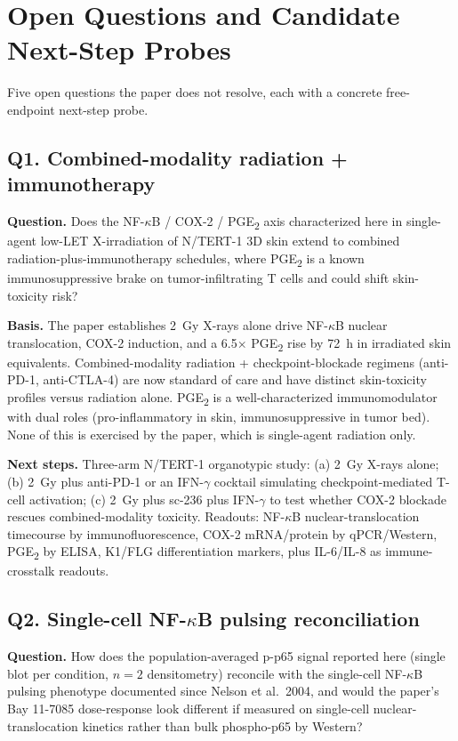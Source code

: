 \section{Open Questions and Candidate Next-Step Probes}

Five open questions the paper does not resolve, each with a concrete free-endpoint next-step probe.

\subsection*{Q1. Combined-modality radiation + immunotherapy}
\textbf{Question.} Does the NF-$\kappa$B / COX-2 / PGE\textsubscript{2} axis characterized here in single-agent low-LET X-irradiation of N/TERT-1 3D skin extend to combined radiation-plus-immunotherapy schedules, where PGE\textsubscript{2} is a known immunosuppressive brake on tumor-infiltrating T cells and could shift skin-toxicity risk?

\textbf{Basis.} The paper establishes 2~Gy X-rays alone drive NF-$\kappa$B nuclear translocation, COX-2 induction, and a 6.5$\times$ PGE\textsubscript{2} rise by 72~h in irradiated skin equivalents. Combined-modality radiation + checkpoint-blockade regimens (anti-PD-1, anti-CTLA-4) are now standard of care and have distinct skin-toxicity profiles versus radiation alone. PGE\textsubscript{2} is a well-characterized immunomodulator with dual roles (pro-inflammatory in skin, immunosuppressive in tumor bed). None of this is exercised by the paper, which is single-agent radiation only.

\textbf{Next steps.} Three-arm N/TERT-1 organotypic study: (a) 2~Gy X-rays alone; (b) 2~Gy plus anti-PD-1 or an IFN-$\gamma$ cocktail simulating checkpoint-mediated T-cell activation; (c) 2~Gy plus sc-236 plus IFN-$\gamma$ to test whether COX-2 blockade rescues combined-modality toxicity. Readouts: NF-$\kappa$B nuclear-translocation timecourse by immunofluorescence, COX-2 mRNA/protein by qPCR/Western, PGE\textsubscript{2} by ELISA, K1/FLG differentiation markers, plus IL-6/IL-8 as immune-crosstalk readouts.

\subsection*{Q2. Single-cell NF-$\kappa$B pulsing reconciliation}
\textbf{Question.} How does the population-averaged p-p65 signal reported here (single blot per condition, $n=2$ densitometry) reconcile with the single-cell NF-$\kappa$B pulsing phenotype documented since Nelson et al.\ 2004, and would the paper's Bay 11-7085 dose-response look different if measured on single-cell nuclear-translocation kinetics rather than bulk phospho-p65 by Western?

